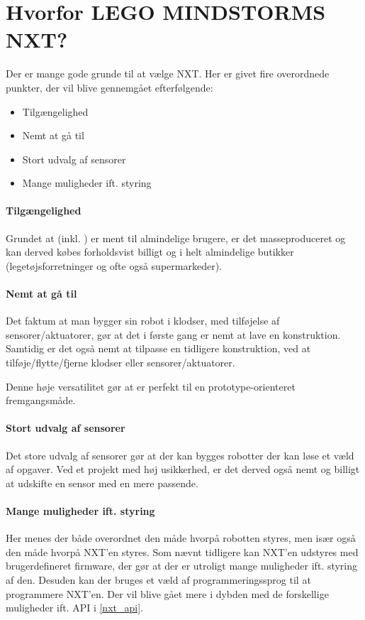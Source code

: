 \section{Hvorfor LEGO MINDSTORMS NXT?}
Der er mange gode grunde til at vælge \legoms NXT.
Her er givet fire overordnede punkter, der vil blive gennemgået efterfølgende:

\begin{itemize}
\item{Tilgængelighed}
\item{Nemt at gå til}
\item{Stort udvalg af sensorer}
\item{Mange muligheder ift. styring}
\end{itemize}

\paragraph{Tilgængelighed}
Grundet at \lego (inkl. \legoms) er ment til almindelige brugere, er det masseproduceret og kan derved købes forholdsvist billigt og i helt almindelige butikker (legetøjsforretninger og ofte også supermarkeder).

\paragraph{Nemt at gå til}
Det faktum at man bygger sin robot i \lego klodser, med tilføjelse af \legoms sensorer/aktuatorer, gør at det i første gang er nemt at lave en konstruktion.
Samtidig er det også nemt at tilpasse en tidligere konstruktion, ved at tilføje/flytte/fjerne klodser eller sensorer/aktuatorer.

Denne høje versatilitet gør at \lego er perfekt til en prototype-orienteret fremgangsmåde.

\paragraph{Stort udvalg af sensorer}
Det store udvalg af sensorer gør at der kan bygges robotter der kan løse et væld af opgaver.
Ved et projekt med høj usikkerhed, er det derved også nemt og billigt at udskifte en sensor med en mere passende.

\paragraph{Mange muligheder ift. styring}
Her menes der både overordnet den måde hvorpå robotten styres, men især også den måde hvorpå NXT'en styres.
Som nævnt tidligere kan NXT'en udstyres med brugerdefineret firmware, der gør at der er utroligt mange muligheder ift. styring af den.
Desuden kan der bruges et væld af programmeringssprog til at programmere NXT'en.
Der vil blive gået mere i dybden med de forskellige muligheder ift. API i \cref{nxt_api}.



